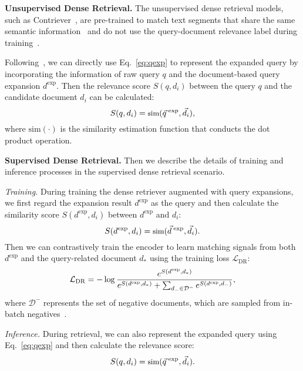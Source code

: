 



\textbf{Unsupervised Dense Retrieval.} The unsupervised dense retrieval models, such as Contriever~\cite{izacard2021unsupervised}, are pre-trained to match text segments that share the same semantic information~\cite{fang2020cert,wu2020clear} and do not use the query-document relevance label during training~\cite{bajaj2016ms}.


Following~\citet{gao2023precise}, we can directly use Eq.~\ref{eq:qexp} to represent the expanded query by incorporating the information of raw query $q$ and the document-based query expansion $d^{\text{exp}}$. Then the relevance score $S(q, d_i)$ between the query $q$ and the candidate document $d_i$ can be calculated:
\begin{equation}
\small
    S(q, d_i) = \text{sim} (\vec{q}^{\; \text{exp}}, \vec{d}_i),
\end{equation}
where $\text{sim} (\cdot)$ is the similarity estimation function that conducts the dot product operation.

\textbf{Supervised Dense Retrieval.} Then we describe the details of training and inference processes in the supervised dense retrieval scenario.

\textit{Training.} During training the dense retriever augmented with query expansions, we first regard the expansion result $d^{\text{exp}}$ as the query and then calculate the similarity score $S(d^{\text{exp}}, d_i)$ between $d^{\text{exp}}$ and $d_i$:
\begin{equation}
\small
    S(d^{\text{exp}}, d_i) = \text{sim} (\vec{d}^{\; \text{exp}}, \vec{d}_i).
\end{equation}
Then we can contrastively train the encoder to learn matching signals from both $d^{\text{exp}}$ and the query-related document $d_*$ using the training loss $\mathcal{L}_\text{DR}$:
\begin{equation}
\small
 \mathcal{L}_\text{DR} = -\log\frac{e^{S(d^{\text{exp}},d_*)}}
    {e^{S(d^{\text{exp}},d_*)} + \sum_{d_-\in \mathcal{D}^-}{e^{S(d^{\text{exp}},d_-)}}},
\end{equation}
where $\mathcal{D}^-$ represents the set of negative documents, which are sampled from in-batch negatives~\cite{karpukhin2020dense}. 

\textit{Inference.} During retrieval, we can also represent the expanded query using Eq.~\ref{eq:qexp} and then calculate the relevance score:
\begin{equation}
\small
    S(q, d_i) = \text{sim} (\vec{q}^{\; \text{exp}}, \vec{d}_i).
\end{equation}




